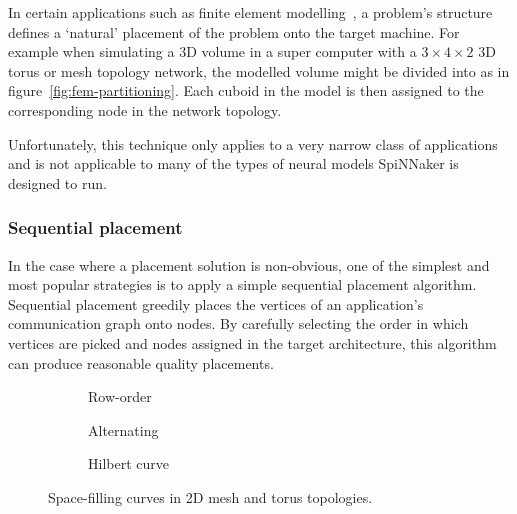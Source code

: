 				In certain applications such as finite element
				modelling~\cite{bermejo13}, a problem's structure defines a `natural'
				placement of the problem onto the target machine. For example when
				simulating a 3D volume in a super computer with a $3 \times 4 \times 2$
				3D torus or mesh topology network, the modelled volume might be divided
				into as in figure~\ref{fig:fem-partitioning}. Each cuboid in the model
				is then assigned to the corresponding node in the network topology.
				
				Unfortunately, this technique only applies to a very narrow class of
				applications and is not applicable to many of the types of neural
				models SpiNNaker is designed to run.
			
			\subsubsection{Sequential placement}
				
				In the case where a placement solution is non-obvious, one of the
				simplest and most popular strategies is to apply a simple sequential
				placement algorithm. Sequential placement greedily places the vertices
				of an application's communication graph onto nodes. By carefully
				selecting the order in which vertices are picked and nodes assigned in
				the target architecture, this algorithm can produce reasonable quality
				placements.
				
				\begin{figure}
					\center
					\begin{subfigure}{0.32\linewidth}
						\center
						\caption{Row-order}
						\label{fig:sequential-row-order}
					\end{subfigure}
					\begin{subfigure}{0.32\linewidth}
						\center
						\caption{Alternating}
						\label{fig:sequential-alternating}
					\end{subfigure}
					\begin{subfigure}{0.32\linewidth}
						\center
						\caption{Hilbert curve}
						\label{fig:sequential-hilbert}
					\end{subfigure}
					
					\caption{Space-filling curves in 2D mesh and torus topologies.}
					\label{fig:sequential}
				\end{figure}
				
